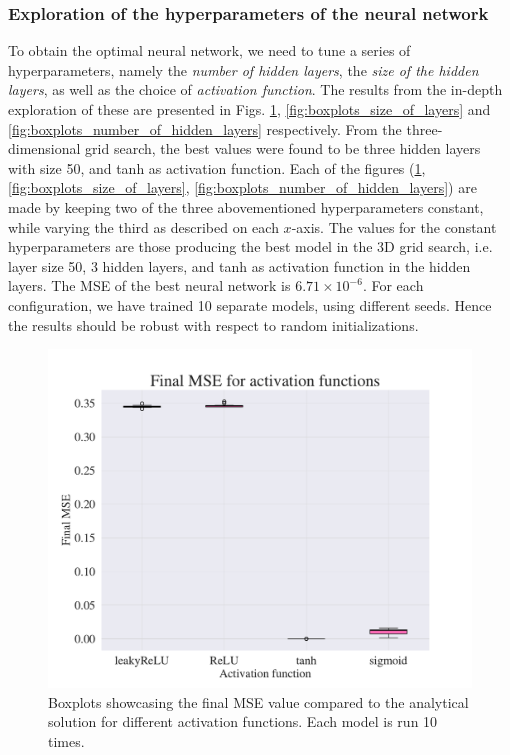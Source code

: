 \subsubsection{Exploration of the hyperparameters of the neural network}

To obtain the optimal neural network, we need to tune a series of hyperparameters, namely the \textit{number of hidden layers}, the \textit{size of the hidden layers}, as well as the choice of \textit{activation function}. The results from the in-depth exploration of these are presented in Figs. \ref{fig:boxplots_activations}, \ref{fig:boxplots_size_of_layers} and \ref{fig:boxplots_number_of_hidden_layers} respectively. 
From the three-dimensional grid search, the best values were found to be three hidden layers with size 50, and tanh as activation function.
Each of the figures (\ref{fig:boxplots_activations}, \ref{fig:boxplots_size_of_layers}, \ref{fig:boxplots_number_of_hidden_layers}) are made by keeping two of the three abovementioned hyperparameters constant, while varying the third as described on each $x$-axis.
The values for the constant hyperparameters are those producing the best model in the 3D grid search, i.e. layer size 50, 3 hidden layers, and tanh as activation function in the hidden layers.
The MSE of the best neural network is $ 6.71 \times 10^{-6}$.\label{best_nn_mse}
For each configuration, we have trained 10 separate models, using different seeds.
Hence the results should be robust with respect to random initializations.

\begin{figure}[h!]
    \centering
    \includegraphics[width=1.0\linewidth]{project_3/plots/activation_search.pdf}
    \caption{Boxplots showcasing the final MSE value compared to the analytical solution for different activation functions. Each model is run 10 times.}
    \label{fig:boxplots_activations}
\end{figure}

